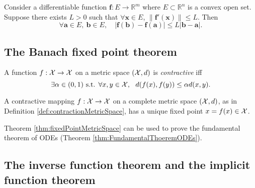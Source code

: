 \begin{thm}
  \label{thm:C1impliesLipschitzContinuity}
  Consider a differentiable function
  $\mathbf{f}: E\rightarrow \mathbb{R}^m$
  where $E\subset \mathbb{R}^n$ is a convex open set.
  Suppose there exists $L>0$ such that
  $\forall \mathbf{x}\in E$, $\|\mathbf{f}'(\mathbf{x})\|\le L$.
  Then
  \begin{equation}
    \label{eq:C1impliesLipschitzContinuity}
    \forall \mathbf{a}\in E,\ \mathbf{b}\in E,\quad
    |\mathbf{f}(\mathbf{b})-\mathbf{f}(\mathbf{a})|
    \le L |\mathbf{b}-\mathbf{a}|. 
  \end{equation}
\end{thm}



\subsection{The Banach fixed point theorem}
\label{sec:banach-fixed-point}

\begin{defn}
  \label{def:contractionMetricSpace}
  A function $f:{\cal X}\rightarrow {\cal X}$
  on a metric space $({\cal X},d)$
  is \emph{contractive} iff
  \begin{equation}
    \label{eq:contractionMetricSpace}
    \exists \alpha\in(0,1) \text{ s.t. }
    \forall x,y\in {\cal X}, \ \ 
    d(f(x),f(y)) \le \alpha d(x,y).
  \end{equation}
\end{defn}


\begin{thm}
  \label{thm:fixedPointMetricSpace}
  A contractive mapping $f:{\cal X}\rightarrow {\cal X}$
  on a complete metric space $({\cal X},d)$, 
  as in Definition \ref{def:contractionMetricSpace}, 
  has a unique fixed point $x=f(x)\in {\cal X}$.
\end{thm}


\begin{exm}
  Theorem \ref{thm:fixedPointMetricSpace}
  can be used to prove the fundamental theorem of ODEs
  (Theorem \ref{thm:FundamentalThoeremODEs}). 
\end{exm}



\subsection{The inverse function theorem
  and the implicit function theorem}

